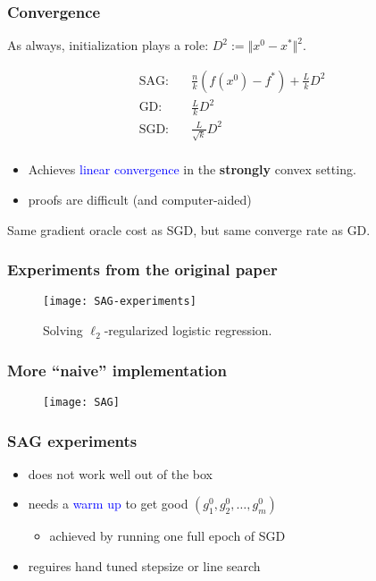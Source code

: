 \documentclass[aspectratio=149]{beamer}
\begin{document}
\begin{frame}
  \frametitle{Convergence}
  As always, initialization plays a role: $D^2 := \Vert x^0 -x^* \Vert^2$.

  \begin{equation}
    \begin{aligned}
      \text{SAG:}& \quad \frac{n}{k}(f(x^0)-f^*) + \frac{L}{k}D^2 \\
      \text{GD:}& \quad \frac{L}{k}D^2 \\
      \text{SGD:}& \quad \frac{L}{\sqrt{k}}D^2 \\
    \end{aligned}
  \end{equation}
  \begin{itemize}
    \item Achieves \textcolor{blue}{linear convergence} in the \textbf{strongly} convex setting.
    \item proofs are difficult (and computer-aided)
  \end{itemize}


  \begin{center}
    Same gradient oracle cost as SGD, but same converge rate as GD.
  \end{center}
\end{frame}


\begin{frame}
  \frametitle{Experiments from the original paper}
  \begin{figure}[ht]
    \centering
    \texttt{[image: SAG-experiments]}
    \caption{ Solving $\ell_2$-regularized logistic regression.}
  \end{figure}
\end{frame}


\begin{frame}
  \frametitle{More ``naive'' implementation}
  \begin{figure}[ht]
    \centering
    \texttt{[image: SAG]}
  \end{figure}
\end{frame}


\begin{frame}
  \frametitle{SAG experiments}
  \begin{itemize}
    \item does not work well out of the box
    \item needs a \textcolor{blue}{warm up} to get good $(g_1^0, g_2^0, \dots, g_m^0)$
          \begin{itemize}
            \item achieved by running one full epoch of SGD
          \end{itemize}
    \item reguires hand tuned stepsize or line search
  \end{itemize}

\end{frame}
\end{document}
